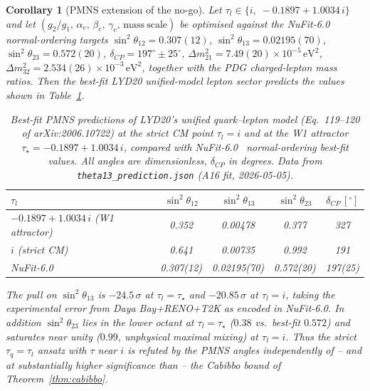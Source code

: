 \documentclass[a4paper,11pt]{article}
\newtheorem{corollary}{Corollary}
\begin{document}
\begin{corollary}[PMNS extension of the no-go]
\label{cor:pmns}
Let $\tau_l\in\{i,\;-0.1897+1.0034\,i\}$ and let
$(g_2/g_1,\,\alpha_e,\,\beta_e,\,\gamma_e,\,\mathrm{mass\ scale})$
be optimised against the NuFit-6.0~\cite{NuFit60} normal-ordering
targets $\sin^2\theta_{12} = 0.307(12)$,
$\sin^2\theta_{13} = 0.02195(70)$,
$\sin^2\theta_{23} = 0.572(20)$,
$\delta_{CP} = 197^\circ\pm 25^\circ$,
$\Delta m^2_{21} = 7.49(20)\times 10^{-5}\,\mathrm{eV}^2$,
$\Delta m^2_{32} = 2.534(26)\times 10^{-3}\,\mathrm{eV}^2$,
together with the PDG charged-lepton mass ratios.  Then the best-fit
LYD20 unified-model lepton sector predicts the values shown in
Table~\ref{tab:pmns_pred}.

\begin{table}[h]
\centering
\caption{Best-fit PMNS predictions of LYD20's unified quark--lepton
model (Eq.~119--120 of arXiv:2006.10722) at the strict CM point
$\tau_l=i$ and at the W1 attractor $\tau_\star = -0.1897+1.0034\,i$,
compared with NuFit-6.0~\cite{NuFit60} normal-ordering best-fit
values.  All angles are dimensionless, $\delta_{CP}$ in degrees.
Data from \texttt{theta13\_prediction.json} (A16 fit, 2026-05-05).}
\label{tab:pmns_pred}
\begin{tabular}{lcccc}
\toprule
$\tau_l$ & $\sin^2\theta_{12}$ & $\sin^2\theta_{13}$ &
  $\sin^2\theta_{23}$ & $\delta_{CP}\,[^\circ]$ \\
\midrule
$-0.1897 + 1.0034\,i$ (W1 attractor) & 0.352 & 0.00478 & 0.377 & 327 \\
$i$ (strict CM)                      & 0.641 & 0.00735 & 0.992 & 191 \\
\midrule
NuFit-6.0~\cite{NuFit60}             & 0.307(12) & 0.02195(70) & 0.572(20) & 197(25) \\
\bottomrule
\end{tabular}
\end{table}

\noindent
The pull on $\sin^2\theta_{13}$ is
$-24.5\,\sigma$ at $\tau_l=\tau_\star$ and $-20.85\,\sigma$ at
$\tau_l=i$, taking the experimental error from Daya Bay+RENO+T2K as
encoded in NuFit-6.0.  In addition $\sin^2\theta_{23}$ lies in the
\emph{lower} octant at $\tau_l=\tau_\star$ ($0.38$ vs.~best-fit
$0.572$) and saturates near unity ($0.99$, unphysical maximal mixing)
at $\tau_l=i$.  Thus the strict $\tau_q=\tau_l$ ansatz with $\tau$
near $i$ is refuted by the PMNS angles independently of -- and at
substantially higher significance than -- the Cabibbo bound of
Theorem~\ref{thm:cabibbo}.
\end{corollary}
\end{document}
